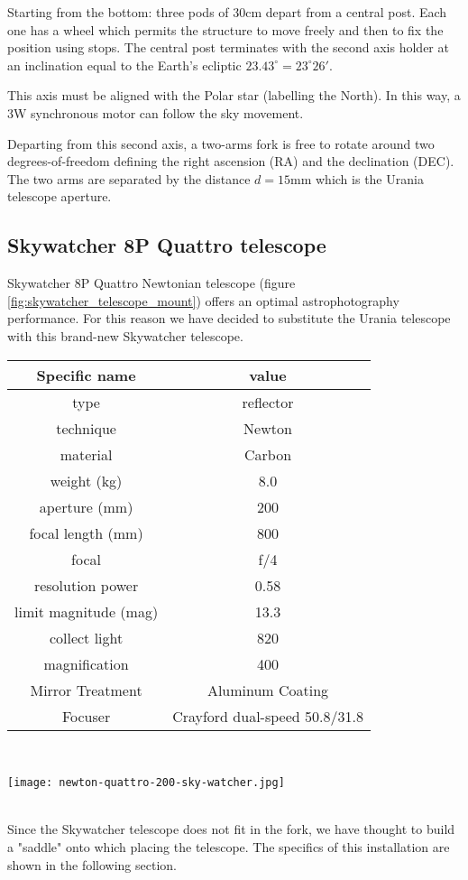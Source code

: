 Starting from the bottom: three pods of 30cm depart from a central post. Each one has a wheel which permits the structure to move freely and then to fix the position using stops.
The central post terminates with the second axis holder at an inclination equal to the Earth's ecliptic \(23.43^{\circ} = 23^{\circ} 26'\).

This axis must be aligned with the Polar star (labelling the North).
In this way, a 3W synchronous motor can follow the sky movement.

Departing from this second axis, a two-arms fork is free to rotate around two degrees-of-freedom defining the right ascension (RA) and the declination (DEC).
The two arms are separated by the distance \(d = 15\)mm which is the Urania telescope aperture.
\subsection{Skywatcher 8P Quattro telescope}
Skywatcher 8P Quattro Newtonian telescope (figure \ref{fig:skywatcher_telescope_mount}) offers an optimal astrophotography performance.
For this reason we have decided to substitute the Urania telescope with this brand-new Skywatcher telescope.
\\
\begin{minipage}{0.5\textwidth}
    \centering
    \begin{tabular}{c|c}
        Specific name & value \\
        \hline
        type & reflector \\
        technique & Newton  \\
        material & Carbon  \\
        weight (kg) & 8.0 \\
        aperture (mm) & 200 \\
        focal length (mm) & 800 \\
        focal & f/4 \\
        resolution power & 0.58 \\
        limit magnitude (mag) & 13.3 \\
        collect light & 820 \\
        magnification & 400 \\
        Mirror Treatment & Aluminum Coating \\
        Focuser & Crayford dual-speed 50.8/31.8 \\
        \hline
    \end{tabular}
    \label{tab_skywatcher_quattro}
\end{minipage}
\\
\begin{minipage}{0.5\textwidth}
    \centering
    \texttt{[image: newton-quattro-200-sky-watcher.jpg]}
    \label{fig:skywatcher_telescope_mount}
\end{minipage}
\\
Since the Skywatcher telescope does not fit in the fork, we have thought to build a "saddle" onto which placing the telescope.
The specifics of this installation are shown in the following section.